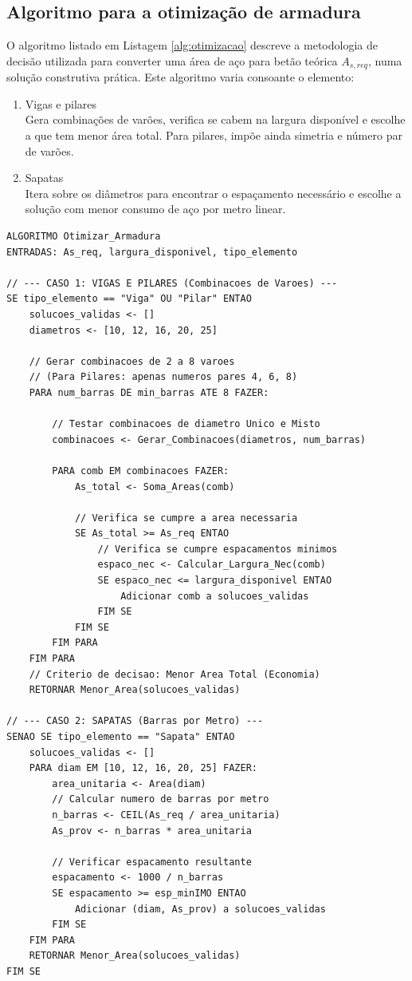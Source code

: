 \subsection{Algoritmo para a otimização de armadura}
O algoritmo listado em Listagem \ref{alg:otimizacao} descreve a metodologia de decisão utilizada para converter uma área de aço para betão teórica $A_{s,req}$, numa solução construtiva prática. Este algoritmo varia consoante o elemento:
\begin{enumerate}
    \item Vigas e pilares\\
    Gera combinações de varões, verifica se cabem na largura disponível e escolhe a que tem menor área total. Para pilares, impõe ainda simetria e número par de varões.
    \item Sapatas\\
    Itera sobre os diâmetros para encontrar o espaçamento necessário e escolhe a solução com menor consumo de aço por metro linear.
\end{enumerate}

\begin{lstlisting}[style=PseudoStyle, basicstyle=\ttfamily\normalsize, caption={Otimização de Armadura (armadura\_service.py)}, label={alg:otimizacao}]
ALGORITMO Otimizar_Armadura
ENTRADAS: As_req, largura_disponivel, tipo_elemento

// --- CASO 1: VIGAS E PILARES (Combinacoes de Varoes) ---
SE tipo_elemento == "Viga" OU "Pilar" ENTAO
    solucoes_validas <- []
    diametros <- [10, 12, 16, 20, 25]
    
    // Gerar combinacoes de 2 a 8 varoes
    // (Para Pilares: apenas numeros pares 4, 6, 8)
    PARA num_barras DE min_barras ATE 8 FAZER:
        
        // Testar combinacoes de diametro Unico e Misto
        combinacoes <- Gerar_Combinacoes(diametros, num_barras)
        
        PARA comb EM combinacoes FAZER:
            As_total <- Soma_Areas(comb)
            
            // Verifica se cumpre a area necessaria
            SE As_total >= As_req ENTAO
                // Verifica se cumpre espacamentos minimos
                espaco_nec <- Calcular_Largura_Nec(comb)
                SE espaco_nec <= largura_disponivel ENTAO
                    Adicionar comb a solucoes_validas
                FIM SE
            FIM SE
        FIM PARA
    FIM PARA
    // Criterio de decisao: Menor Area Total (Economia)
    RETORNAR Menor_Area(solucoes_validas)

// --- CASO 2: SAPATAS (Barras por Metro) ---
SENAO SE tipo_elemento == "Sapata" ENTAO
    solucoes_validas <- []
    PARA diam EM [10, 12, 16, 20, 25] FAZER:
        area_unitaria <- Area(diam)
        // Calcular numero de barras por metro
        n_barras <- CEIL(As_req / area_unitaria)
        As_prov <- n_barras * area_unitaria
        
        // Verificar espacamento resultante
        espacamento <- 1000 / n_barras
        SE espacamento >= esp_minIMO ENTAO
            Adicionar (diam, As_prov) a solucoes_validas
        FIM SE
    FIM PARA
    RETORNAR Menor_Area(solucoes_validas)
FIM SE
\end{lstlisting}